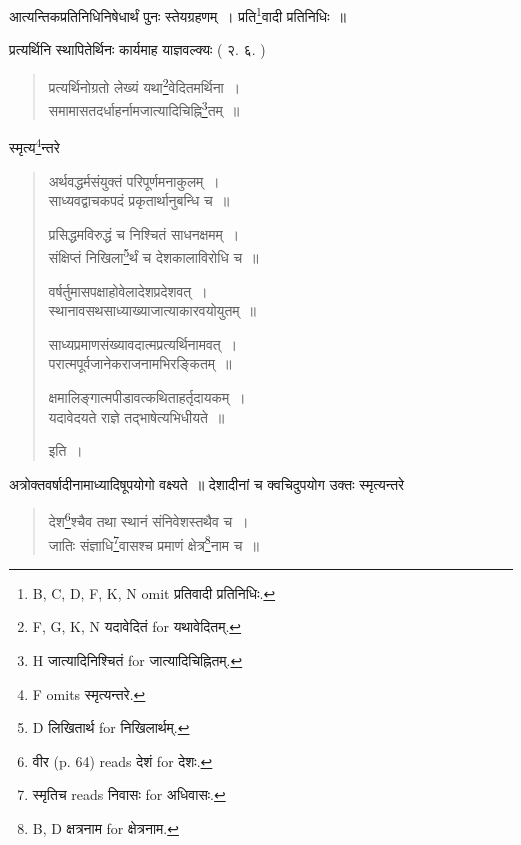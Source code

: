 \documentclass[11pt, openany]{book}
\begin{document}
\newpage
{}

\noindent
आत्यन्तिकप्रतिनिधिनिषेधार्थं पुनः स्तेयग्रहणम्~। प्रति\renewcommand{\thefootnote}{1}\footnote{B, C, D, F, K, N omit प्रतिवादी प्रतिनिधिः.}वादी प्रतिनिधिः~॥

प्रत्यर्थिनि स्थापितेर्थिनः कार्यमाह याज्ञवल्क्यः ( २. ६. )

\begin{quote}
{\vy प्रत्यर्थिनोग्रतो लेख्यं यथा\renewcommand{\thefootnote}{2}\footnote{F, G, K, N यदावेदितं for यथावेदितम्.}वेदितमर्थिना~।\\
समामासतदर्धाहर्नामजात्यादिचिह्नि\renewcommand{\thefootnote}{3}\footnote{H जात्यादिनिश्चितं for जात्यादिचिह्नितम्.}तम्~॥}
\end{quote}

स्मृत्य\renewcommand{\thefootnote}{4}\footnote{F omits स्मृत्यन्तरे.}न्तरे

\begin{quote}
{\vy अर्थवद्धर्मसंयुक्तं परिपूर्णमनाकुलम्~।\\
साध्यवद्वाचकपदं प्रकृतार्थानुबन्धि च~॥ 

प्रसिद्धमविरुद्धं च निश्चितं साधनक्षमम्~।\\
संक्षिप्तं निखिला\renewcommand{\thefootnote}{5}\footnote{D लिखितार्थ for निखिलार्थम्.}र्थं च देशकालाविरोधि च~॥

वर्षर्तुमासपक्षाहोवेलादेशप्रदेशवत्~।\\
स्थानावसथसाध्याख्याजात्याकारवयोयुतम्~॥

साध्यप्रमाणसंख्यावदात्मप्रत्यर्थिनामवत्~।\\
परात्मपूर्वजानेकराजनामभिरङ्कितम्~॥

क्षमालिङ्गात्मपीडावत्कथिताहर्तृदायकम्~।\\
यदावेदयते राज्ञे तद्भाषेत्यभिधीयते~॥} इति~।
\end{quote}

अत्रोक्तवर्षादीनामाध्यादिषूपयोगो वक्ष्यते~॥ देशादीनां च क्वचिदुपयोग उक्तः स्मृत्यन्तरे

\begin{quote}
{\vy देश\renewcommand{\thefootnote}{6}\footnote{वीर (p. 64) reads देशं for देशः.}श्चैव तथा स्थानं संनिवेशस्तथैव च~।\\
जातिः संज्ञाधि\renewcommand{\thefootnote}{7}\footnote{स्मृतिच reads निवासः for अधिवासः.}वासश्च प्रमाणं क्षेत्र\renewcommand{\thefootnote}{8}\footnote{B, D क्षत्रनाम for क्षेत्रनाम.}नाम च~॥}
\end{quote}
\end{document}
